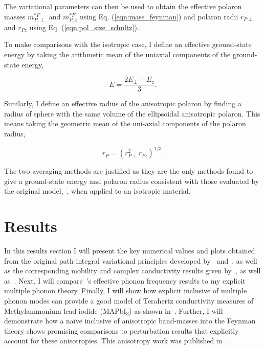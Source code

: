 The variational parameters can then be used to obtain the effective polaron masses $m^{*F}_{P,\perp}$ and $m^{*F}_{P, z}$ using Eq. (\ref{eqn:mass_feynman}) and polaron radii $r_{P\perp}$ and $r_{Pz}$ using Eq. (\ref{eqn:pol_size_schultz}). 

To make comparisons with the isotropic case, I define an effective ground-state energy by taking the arithmetic mean of the uniaxial components of the ground-state energy,

\begin{equation}
    E = \frac{2 E_\perp + E_z}{3}.
\end{equation}

Similarly, I define an effective radius of the anisotropic polaron by finding a radius of sphere with the same volume of the ellipsoidal anisotropic polaron. This means taking the geometric mean of the uni-axial components of the polaron radius, 

\begin{equation}
    r_P = \left(r^2_{P\perp} r_{Pz}\right)^{1/3}.
\end{equation}

The two averaging methods are justified as they are the only methods found to give a ground-state energy and polaron radius consistent with those evaluated by the original model,~\cite{feynman_slow_1955}, when applied to an isotropic material.

\section{Results}

In this results section I will present the key numerical values and plots obtained from the original path integral variational principles developed by~\cite{feynman_slow_1955} and~\cite{osaka_polaron_1959}, as well as the corresponding mobility and complex conductivity results given by~\cite{feynman_mobility_1962}, as well as~\cite{devreese_optical_1972}. Next, I will compare~\cite{hellwarth_mobility_1999}'s effective phonon frequency results to my explicit multiple phonon theory. Finally, I will show how explicit inclusive of multiple phonon modes can provide a good model of Terahertz conductivity measures of Methylammonium lead iodide (MAPbI$_3$) as shown in~\cite{zheng_multipulse_2021}. Further, I will demonstrate how a na\"ive inclusive of anisotropic band-masses into the Feynman theory shows promising comparisons to perturbation results that explicitly account for these anisotropies. This anisotropy work was published in~\cite{guster_frohlich_2021}. 


